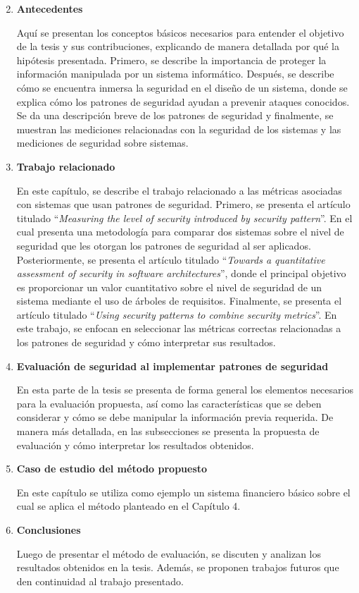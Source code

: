 \begin{enumerate}[label=Capítulo \arabic*,leftmargin=*]
	\setcounter{enumi}{1}
	\item \textbf{Antecedentes}
	
		\vspace{0.3cm}
	
		Aquí se presentan los conceptos básicos necesarios para entender el objetivo de la tesis y sus contribuciones, explicando de manera detallada por qué la hipótesis presentada. Primero, se describe la importancia de proteger la información manipulada por un sistema informático. Después, se describe cómo se encuentra inmersa la seguridad en el diseño de un sistema, donde se explica cómo los patrones de seguridad ayudan a prevenir ataques conocidos. Se da una descripción breve de los patrones de seguridad y finalmente, se muestran las mediciones relacionadas con la seguridad de los sistemas y las mediciones de seguridad sobre sistemas.
	\item \textbf{Trabajo relacionado}
	
	\vspace{0.3cm}
	
		En este capítulo, se describe el trabajo relacionado a las métricas asociadas con sistemas que usan patrones de seguridad. Primero, se presenta el artículo titulado ``\textit{Measuring the level of security introduced by security pattern}''. En el cual presenta una metodología para comparar dos sistemas sobre el nivel de seguridad que les otorgan los patrones de seguridad al ser aplicados. Posteriormente, se presenta el artículo titulado ``\textit{Towards a quantitative assessment of security in software architectures}'', donde el principal objetivo es proporcionar un valor cuantitativo sobre el nivel de seguridad de un sistema mediante el uso de árboles de requisitos. Finalmente, se presenta el artículo titulado ``\textit{Using security patterns to combine security metrics}''. En este trabajo, se enfocan en seleccionar las métricas correctas relacionadas a los patrones de seguridad y cómo interpretar sus resultados. 
		  
		\item \textbf{Evaluación de seguridad al implementar patrones de seguridad}
		
		En esta parte de la tesis se presenta de forma general los elementos necesarios para la evaluación propuesta, así como las características que se deben considerar y cómo se debe manipular la información previa requerida. De manera más detallada, en las subsecciones se presenta la propuesta de evaluación y cómo interpretar los resultados obtenidos.
		\item \textbf{Caso de estudio del método propuesto}
		
		En este capítulo se utiliza como ejemplo un sistema financiero básico sobre el cual se aplica el método planteado en el Capítulo 4.
		\item \textbf{Conclusiones}
		
		Luego de presentar el método de evaluación, se discuten y analizan los resultados obtenidos en la tesis. Además, se proponen trabajos futuros que den continuidad al trabajo presentado.
		
\end{enumerate}
